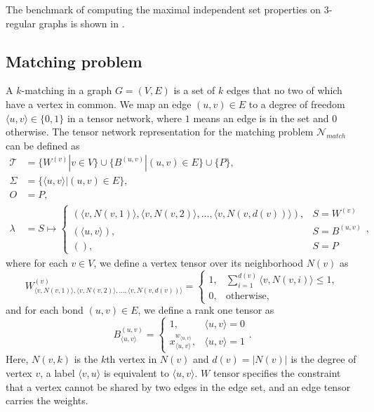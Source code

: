\documentclass[review, onefignum, onetabnum]{siamart190516}
\begin{document}
The benchmark of computing the maximal independent set properties on $3$-regular graphs is shown in .

\subsection{Matching problem}
A $k$-matching in a graph $G=(V,E)$ is a set of $k$ edges that no two of which have a vertex in common.
We map an edge $(u, v) \in E$ to a degree of freedom $\langle u, v\rangle \in \{0, 1\}$ in a tensor network, where $1$ means an edge is in the set and $0$ otherwise.
The tensor network representation for the matching problem $\mathcal{N}_{match}$ can be defined as
\begin{equation}\label{eq:matchtensornetwork}
\begin{split}
    \mathcal{T} &= \{W^{(v)} | v\in V\} \cup \{B^{(u, v)} | (u, v) \in E\} \cup \{P\},\\
    \Sigma &= \{\langle u,v\rangle | (u, v) \in E\},\\
    O &= P,\\
    \lambda &= S \mapsto \begin{cases}
                    (\langle v, N(v, 1)\rangle, \langle v, N(v,2) \rangle, \ldots, \langle v, N(v, d(v))\rangle), & S = W^{(v)}\\
                    (\langle u,v\rangle), & S = B^{(u, v)}\\
                    (), & S = P
                    \end{cases},
\end{split}
\end{equation}
where for each $v\in V$, we define a vertex tensor over its neighborhood $N(v)$ as
\begin{equation}
    W^{(v)}_{\langle v, N(v, 1)\rangle, \langle v, N(v, 2) \rangle, \ldots, \langle v, N(v,d(v))\rangle} = \begin{cases}
        1, & \sum_{i=1}^{d(v)} \langle v, N(v, i) \rangle \leq 1,\\
        0, & \text{otherwise},
    \end{cases}
\end{equation}
and for each bond $(u, v) \in E$, we define a rank one tensor as
\begin{equation}
    B^{(u, v)}_{\langle u, v\rangle} = \begin{cases}
    1, & \langle u, v \rangle = 0 \\
    x^{w_{\langle u,v \rangle}}_{\langle u, v\rangle}, & \langle u, v \rangle = 1
\end{cases}.
\end{equation}
Here, $N(v, k)$ is the $k$th vertex in $N(v)$ and $d(v) = |N(v)|$ is the degree of vertex $v$, a label $\langle v, u \rangle$ is equivalent to $\langle u,v\rangle$.
$W$ tensor specifies the constraint that a vertex cannot be shared by two edges in the edge set, and an edge tensor carries the weights.
\end{document}
